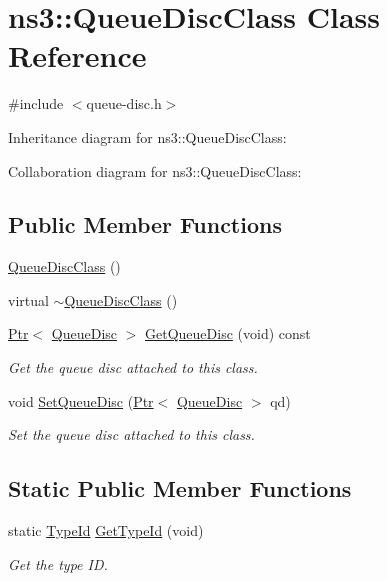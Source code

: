 \hypertarget{classns3_1_1QueueDiscClass}{}\section{ns3\+:\+:Queue\+Disc\+Class Class Reference}
\label{classns3_1_1QueueDiscClass}


{\ttfamily \#include $<$queue-\/disc.\+h$>$}



Inheritance diagram for ns3\+:\+:Queue\+Disc\+Class\+:


Collaboration diagram for ns3\+:\+:Queue\+Disc\+Class\+:
\subsection*{Public Member Functions}
\begin{DoxyCompactItemize}
\item 
\hyperlink{classns3_1_1QueueDiscClass_adac5ca537e0f1dfb7649b64042ddf61d}{Queue\+Disc\+Class} ()
\item 
virtual \hyperlink{classns3_1_1QueueDiscClass_a3a95bc92a0927a9423082e10e54eb9ec}{$\sim$\+Queue\+Disc\+Class} ()
\item 
\hyperlink{classns3_1_1Ptr}{Ptr}$<$ \hyperlink{classns3_1_1QueueDisc}{Queue\+Disc} $>$ \hyperlink{classns3_1_1QueueDiscClass_a1c17dbca43bdb8964b84db0e6807496e}{Get\+Queue\+Disc} (void) const 
\begin{DoxyCompactList}\small\item\em Get the queue disc attached to this class. \end{DoxyCompactList}\item 
void \hyperlink{classns3_1_1QueueDiscClass_ac64f274e0bbc6ed4a17ad0ec6703a77f}{Set\+Queue\+Disc} (\hyperlink{classns3_1_1Ptr}{Ptr}$<$ \hyperlink{classns3_1_1QueueDisc}{Queue\+Disc} $>$ qd)
\begin{DoxyCompactList}\small\item\em Set the queue disc attached to this class. \end{DoxyCompactList}\end{DoxyCompactItemize}
\subsection*{Static Public Member Functions}
\begin{DoxyCompactItemize}
\item 
static \hyperlink{classns3_1_1TypeId}{Type\+Id} \hyperlink{classns3_1_1QueueDiscClass_aab1a70346ee65fc4f3d78a8782618064}{Get\+Type\+Id} (void)
\begin{DoxyCompactList}\small\item\em Get the type ID. \end{DoxyCompactList}\end{DoxyCompactItemize}
